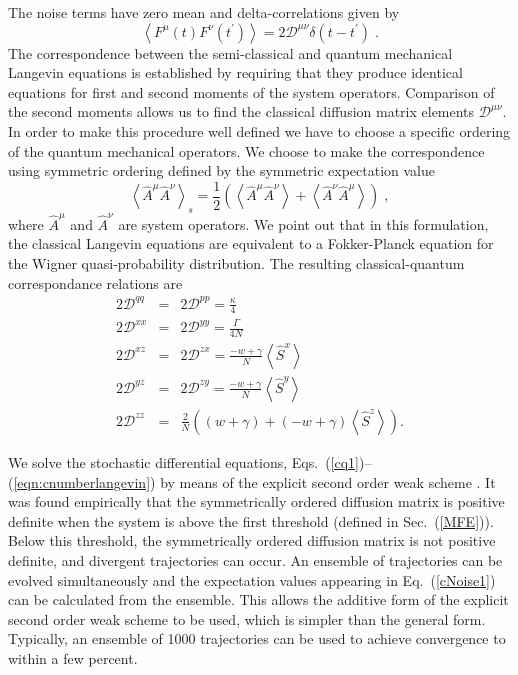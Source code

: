 \documentclass[aps,
twocolumn,
showpacs,
superscriptaddress,groupedaddress]{revtex4}
\begin{document}
The noise terms have zero mean and delta-correlations given by
\begin{equation}
\left< F^{\mu}(t) F^{\nu}(t^{\prime})\right> =
2 \mathscr{D}^{\mu \nu} \delta(t-t^{\prime})\;.
\label{ClassicalDiffusion1}
\end{equation}
The correspondence between the semi-classical and quantum mechanical
Langevin equations is established by requiring that they produce
identical equations for first and second moments of the system
operators.  Comparison of the second moments allows us to find the
classical diffusion matrix elements $\mathscr{D}^{\mu \nu}$.  In order
to make this procedure well defined we have to choose a specific
ordering of the quantum mechanical operators.  We choose to make the
correspondence using symmetric ordering defined by the symmetric
expectation value
\begin{equation}
\left< \hat{A}^{\mu} \hat{A}^{\nu} \right>_s=
\frac{1}{2} \left( \left< \hat{A}^{\mu} \hat{A}^{\nu} \right> + \left<
\hat{A}^{\nu} \hat{A}^{\mu} \right> \right)\;,
\end{equation}
where $\hat{A}^{\mu}$ and $\hat{A}^{\nu}$ are system operators.  We
point out that in this formulation, the classical Langevin equations
are equivalent to a Fokker-Planck equation for the Wigner
quasi-probability distribution. The resulting classical-quantum
correspondance relations are
\begin{eqnarray}
  2\mathscr{D}^{q q}&=&
                        2\mathscr{D}^{p p}=
                        \frac{\kappa}{4} \nonumber \\
  2\mathscr{D}^{xx}&=&
                       2\mathscr{D}^{yy}=
                       \frac{\Gamma}{4N} \nonumber \\
  2\mathscr{D}^{xz}&=&
                       2\mathscr{D}^{zx}=
                       \frac{-w+\gamma}{N} \left< \hat{S}^{x} \right>  
                       \nonumber \\
  2\mathscr{D}^{yz}&=&
                       2\mathscr{D}^{zy}=
                       \frac{-w+\gamma}{N} \left< \hat{S}^{y} \right>  
                       \nonumber \\
  2\mathscr{D}^{zz}&=&
                       \frac{2}{N}\left((w+\gamma) 
                       + (-w+\gamma)  \left< \hat{S}^{z} \right> \right).
\label{cNoise1}
\end{eqnarray}

We solve the stochastic differential equations,
Eqs.~(\ref{cq1})--(\ref{eqn:cnumberlangevin}) by means of the explicit
second order weak scheme \cite{kloeden2011numerical}. It was found
empirically that the symmetrically ordered diffusion matrix is
positive definite when the system is above the first threshold
(defined in Sec.~(\ref{MFE})). Below this threshold, the symmetrically
ordered diffusion matrix is not positive definite, and divergent
trajectories can occur. An ensemble of trajectories can be evolved
simultaneously and the expectation values appearing in
Eq.~(\ref{cNoise1}) can be calculated from the ensemble. This allows
the additive form of the explicit second order weak scheme to be used,
which is simpler than the general form. Typically, an ensemble of 1000
trajectories can be used to achieve convergence to within a few
percent.
\end{document}
